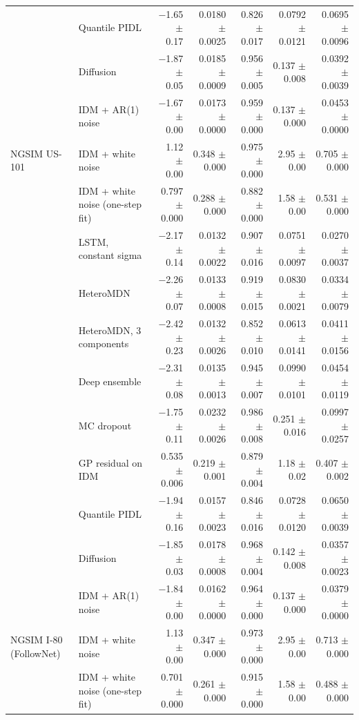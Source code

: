 \begin{longtable}{llrrrrr}
 & Quantile PIDL & $-$1.65 $\pm$ 0.17 & 0.0180 $\pm$ 0.0025 & 0.826 $\pm$ 0.017 & 0.0792 $\pm$ 0.0121 & 0.0695 $\pm$ 0.0096 \\
 & Diffusion & $-$1.87 $\pm$ 0.05 & 0.0185 $\pm$ 0.0009 & 0.956 $\pm$ 0.005 & 0.137 $\pm$ 0.008 & 0.0392 $\pm$ 0.0039 \\
 & IDM + AR(1) noise & $-$1.67 $\pm$ 0.00 & 0.0173 $\pm$ 0.0000 & 0.959 $\pm$ 0.000 & 0.137 $\pm$ 0.000 & 0.0453 $\pm$ 0.0000 \\
\midrule
NGSIM US-101 & IDM + white noise & 1.12 $\pm$ 0.00 & 0.348 $\pm$ 0.000 & 0.975 $\pm$ 0.000 & 2.95 $\pm$ 0.00 & 0.705 $\pm$ 0.000 \\
 & IDM + white noise (one-step fit) & 0.797 $\pm$ 0.000 & 0.288 $\pm$ 0.000 & 0.882 $\pm$ 0.000 & 1.58 $\pm$ 0.00 & 0.531 $\pm$ 0.000 \\
 & LSTM, constant sigma & $-$2.17 $\pm$ 0.14 & 0.0132 $\pm$ 0.0022 & 0.907 $\pm$ 0.016 & 0.0751 $\pm$ 0.0097 & 0.0270 $\pm$ 0.0037 \\
 & HeteroMDN & $-$2.26 $\pm$ 0.07 & 0.0133 $\pm$ 0.0008 & 0.919 $\pm$ 0.015 & 0.0830 $\pm$ 0.0021 & 0.0334 $\pm$ 0.0079 \\
 & HeteroMDN, 3 components & $-$2.42 $\pm$ 0.23 & 0.0132 $\pm$ 0.0026 & 0.852 $\pm$ 0.010 & 0.0613 $\pm$ 0.0141 & 0.0411 $\pm$ 0.0156 \\
 & Deep ensemble & $-$2.31 $\pm$ 0.08 & 0.0135 $\pm$ 0.0013 & 0.945 $\pm$ 0.007 & 0.0990 $\pm$ 0.0101 & 0.0454 $\pm$ 0.0119 \\
 & MC dropout & $-$1.75 $\pm$ 0.11 & 0.0232 $\pm$ 0.0026 & 0.986 $\pm$ 0.008 & 0.251 $\pm$ 0.016 & 0.0997 $\pm$ 0.0257 \\
 & GP residual on IDM & 0.535 $\pm$ 0.006 & 0.219 $\pm$ 0.001 & 0.879 $\pm$ 0.004 & 1.18 $\pm$ 0.02 & 0.407 $\pm$ 0.002 \\
 & Quantile PIDL & $-$1.94 $\pm$ 0.16 & 0.0157 $\pm$ 0.0023 & 0.846 $\pm$ 0.016 & 0.0728 $\pm$ 0.0120 & 0.0650 $\pm$ 0.0039 \\
 & Diffusion & $-$1.85 $\pm$ 0.03 & 0.0178 $\pm$ 0.0008 & 0.968 $\pm$ 0.004 & 0.142 $\pm$ 0.008 & 0.0357 $\pm$ 0.0023 \\
 & IDM + AR(1) noise & $-$1.84 $\pm$ 0.00 & 0.0162 $\pm$ 0.0000 & 0.964 $\pm$ 0.000 & 0.137 $\pm$ 0.000 & 0.0379 $\pm$ 0.0000 \\
\midrule
NGSIM I-80 (FollowNet) & IDM + white noise & 1.13 $\pm$ 0.00 & 0.347 $\pm$ 0.000 & 0.973 $\pm$ 0.000 & 2.95 $\pm$ 0.00 & 0.713 $\pm$ 0.000 \\
 & IDM + white noise (one-step fit) & 0.701 $\pm$ 0.000 & 0.261 $\pm$ 0.000 & 0.915 $\pm$ 0.000 & 1.58 $\pm$ 0.00 & 0.488 $\pm$ 0.000 \\

\end{longtable}

